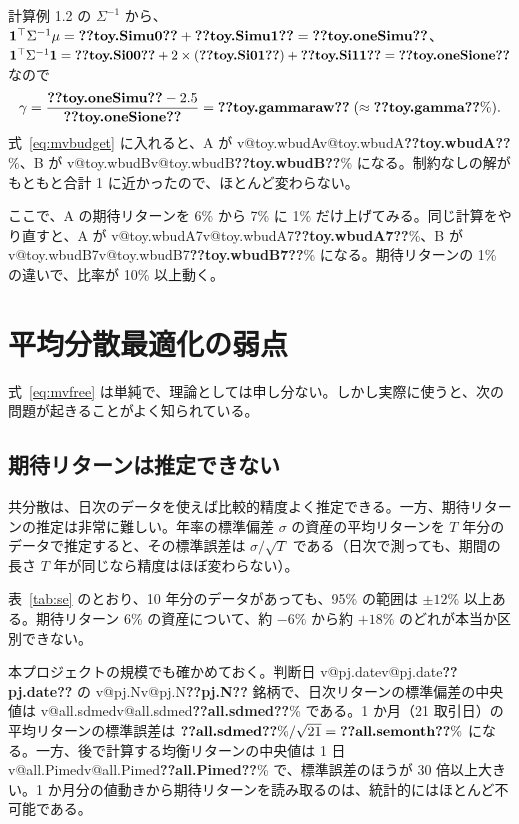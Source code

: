 \documentclass[xelatex,ja=standard,jafont=hiragino-pron,a4paper,11pt,openany]{bxjsreport}
\makeatletter
\newcommand{\V}[1]{\ifcsname v@#1\endcsname\csname v@#1\endcsname\else\textbf{??#1??}\fi}
\newcommand{\tabin}[1]{\adjustbox{max width=\linewidth}{}}
\newcommand{\T}{^{\top}}
\newcommand{\one}{\mathbf{1}}
\newcommand{\tabref}[1]{表~\ref{#1}}
\makeatother
\begin{document}
\begin{exbox}
計算例 1.2 の $\Sigma^{-1}$ から、$\one\T\Sigma^{-1}\mu = \V{toy.Simu0} + \V{toy.Simu1} = \V{toy.oneSimu}$、$\one\T\Sigma^{-1}\one = \V{toy.Si00} + 2 \times (\V{toy.Si01}) + \V{toy.Si11} = \V{toy.oneSione}$ なので
\[
\gamma = \frac{\V{toy.oneSimu} - 2.5}{\V{toy.oneSione}} = \V{toy.gammaraw} \;(\approx \V{toy.gamma}\%).
\]
式~\eqref{eq:mvbudget} に入れると、A が \V{toy.wbudA}\%、B が \V{toy.wbudB}\% になる。制約なしの解がもともと合計 1 に近かったので、ほとんど変わらない。

ここで、A の期待リターンを 6\% から 7\% に 1\% だけ上げてみる。同じ計算をやり直すと、A が \V{toy.wbudA7}\%、B が \V{toy.wbudB7}\% になる。期待リターンの 1\% の違いで、比率が 10\% 以上動く。
\end{exbox}

\section{平均分散最適化の弱点}\label{sec:mvweak}

式~\eqref{eq:mvfree} は単純で、理論としては申し分ない。しかし実際に使うと、次の問題が起きることがよく知られている。

\subsection{期待リターンは推定できない}

共分散は、日次のデータを使えば比較的精度よく推定できる。一方、期待リターンの推定は非常に難しい。年率の標準偏差 $\sigma$ の資産の平均リターンを $T$ 年分のデータで推定すると、その標準誤差は $\sigma/\sqrt{T}$ である（日次で測っても、期間の長さ $T$ 年が同じなら精度はほぼ変わらない）。

\begin{table}[htbp]
\centering
\caption{期待リターンの推定の精度（年率の標準偏差 20\% の資産）。}
\label{tab:se}
\small\tabin{se}
\end{table}

\tabref{tab:se} のとおり、10 年分のデータがあっても、95\% の範囲は $\pm 12\%$ 以上ある。期待リターン 6\% の資産について、約 $-6\%$ から約 $+18\%$ のどれが本当か区別できない。

本プロジェクトの規模でも確かめておく。判断日 \V{pj.date} の \V{pj.N} 銘柄で、日次リターンの標準偏差の中央値は \V{all.sdmed}\% である。1 か月（21 取引日）の平均リターンの標準誤差は $\V{all.sdmed}\% / \sqrt{21} = \V{all.semonth}\%$ になる。一方、後で計算する均衡リターンの中央値は 1 日 \V{all.Pimed}\% で、標準誤差のほうが 30 倍以上大きい。1 か月分の値動きから期待リターンを読み取るのは、統計的にはほとんど不可能である。
\end{document}
